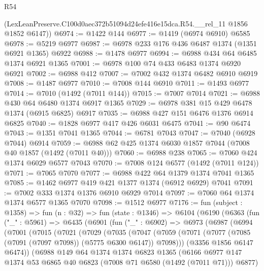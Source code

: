 \begin{lexlean}{R54}
\begin{coremodule}
      (LexLeanPreserve.C100d0aec372b51094d24efe416e15dca.R54.__rel_11 @1856 @1852 @6147))
@6974 := @1422 @144
@6977 := @1419 (@6974 @6910) @6585
@6978 := @5219 @6977
@6987 := @6978 @233 @176 @436 @6487 @1374 (@1351 @6921 @1365) @6922
@6988 := @1478 @6977
@6994 := @6988 @434 @64 @6485 @1374 @6921 @1365
@7001 := @6978 @100 @74 @433 @6483 @1374 @6920 @6921
@7002 := @6988 @412
@7007 := @7002 @432 @1374 @6482 @6910 @6919
@7008 := @1487 @6977
@7010 := @7008 @144 @6910
@7011 := @1493 @6977
@7014 := @7010 (@1492 (@7011 @144))
@7015 := @7007 @7014
@7021 := @6988 @430 @64 @6480 @1374 @6917 @1365
@7029 := @6978 @381 @15 @429 @6478 @1374 (@6915 @6825) @6917
@7035 := @6988 @427 @151 @6476 @1376 @6914 @6825
@7040 := @1828 @6977 @417 @426 @6031 @6475
@7041 := @90 @6474
@7043 := @1351 @7041 @1365
@7044 := @6781 @7043
@7047 := @7040 (@6928 @7044) @6914
@7059 := @6988 @62 @425 @1374 @6030 @1857 @7044 (@7008 @40 @1857 (@1492 (@7011 @40)))
@7060 := @6988 @238
@7065 := @7060 @424 @1374 @6029 @6577 @7043
@7070 := @7008 @124 @6577 (@1492 (@7011 @124))
@7071 := @7065 @7070
@7077 := @6988 @422 @64 @1379 @1374 @7041 @1365
@7085 := @1462 @6977 @419 @421 @1377 @1374 (@6912 @6929) @7041
@7091 := @7002 @333 @1374 @1376 @6910 @6929 @7014
@7097 := @7060 @64 @1374 @1374 @6577 @1365 @7070
@7098 := @1512 @6977
@7176 := fun (subject : @1358) =>
  fun (n : @32) =>
  fun (state : @1346) =>
  @6104
    (@6190
      (@6363
        (fun ("_" : @5961) =>
        @6435
          (@6901
            (fun ("_" : @6902) =>
            @6973
              (@6987
                (@6994
                  (@7001
                    (@7015
                      (@7021
                        (@7029
                          (@7035
                            (@7047
                              (@7059
                                (@7071
                                  (@7077 (@7085 (@7091 (@7097 @7098)) (@5775 @6300 @6147)) @7098)))
                              (@3356 @1856 @6147 @6474))
                            (@6988
                              @149
                              @64
                              @1374
                              @1374
                              @6823
                              @1365
                              (@6166
                                @6977
                                @147
                                @1374
                                @53
                                @6865
                                @40
                                @6823
                                (@7008 @71 @6580 (@1492 (@7011 @71)))
                                @6877)

\end{coremodule}
\end{lexlean}
